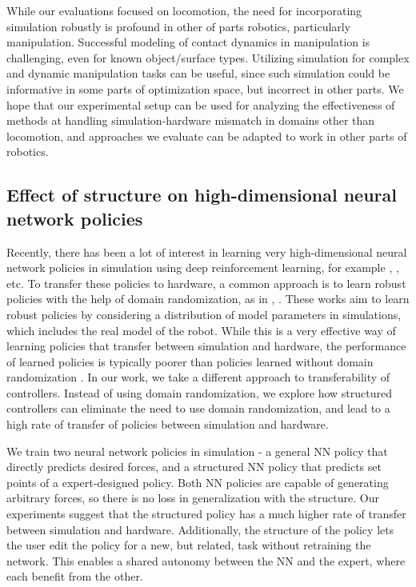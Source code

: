 While our evaluations focused on locomotion, the need for incorporating simulation robustly is profound in other of parts robotics, particularly manipulation. Successful modeling of contact dynamics in manipulation is challenging, even for known object/surface types. Utilizing simulation for complex and dynamic manipulation tasks can be useful, since such simulation could be informative in some parts of optimization space, but incorrect in other parts. 
We hope that our experimental setup can be used for analyzing the effectiveness of methods at handling simulation-hardware mismatch in domains other than locomotion, and approaches we evaluate can be adapted to work in other parts of robotics.



\subsection{Effect of structure on high-dimensional neural network policies}

Recently, there has been a lot of interest in learning very high-dimensional neural network policies in simulation using deep reinforcement learning, for example \cite{rajeswaran2017towards}, \cite{peng2017sim}, etc. To transfer these policies to hardware, a common approach is to learn robust policies with the help of domain randomization, as in \cite{mordatch2015ensemble}, \cite{tan2018sim}. These works aim to 
learn robust policies by considering a distribution of model parameters in simulations, which includes the real model of the robot. While this is a very effective way of learning policies that transfer between simulation and hardware, the performance of learned policies is typically poorer than policies learned without domain randomization \citep{tan2018sim}. In our work, we take a different approach to transferability of controllers. Instead of using domain randomization, we explore how structured controllers can eliminate the need to use domain randomization, and lead to a high rate of transfer of policies between simulation and hardware.

We train two neural network policies in simulation - a general NN policy that directly predicts desired forces, and a structured NN policy that predicts set points of a expert-designed policy. Both NN policies are capable of generating arbitrary forces, so there is no loss in generalization with the structure. Our experiments suggest that the structured policy has a much higher rate of transfer between simulation and hardware. Additionally, the structure of the policy lets the user edit the policy for a new, but related, task without retraining the network. This enables a shared autonomy between the NN and the expert, where each benefit from the other.

